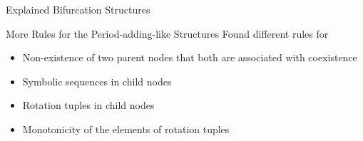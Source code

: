 
\begin{frame}{Explained Bifurcation Structures}
	\begin{figure}
	\end{figure}
\end{frame}

\begin{frame}{More Rules for the Period-adding-like Structures}
	Found different rules for
	\begin{itemize}
		\item Non-existence of two parent nodes that both are associated with coexistence \pause
		\item Symbolic sequences in child nodes \pause
		\item Rotation tuples in child nodes \pause
		\item Monotonicity of the elements of rotation tuples
	\end{itemize}
\end{frame}
